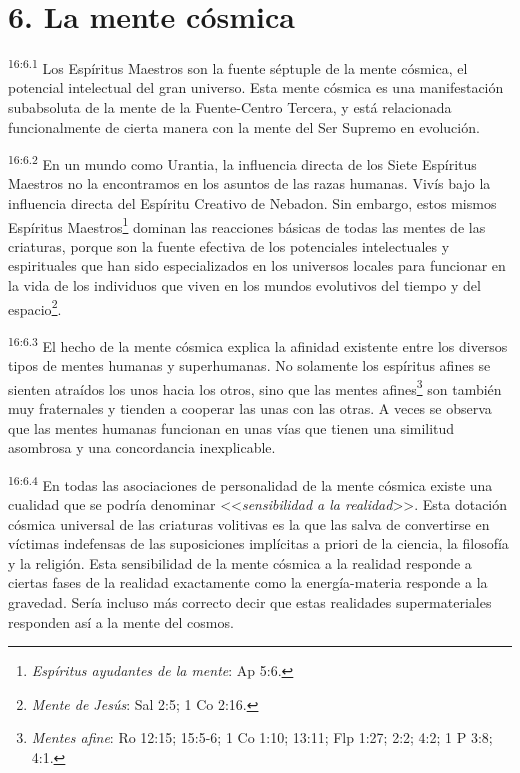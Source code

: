 \section*{6. La mente cósmica}
\par
\textsuperscript{16:6.1} Los Espíritus Maestros son la fuente séptuple de la mente cósmica, el potencial intelectual del gran universo. Esta mente cósmica es una manifestación subabsoluta de la mente de la Fuente-Centro Tercera, y está relacionada funcionalmente de cierta manera con la mente del Ser Supremo en evolución.

\par
\textsuperscript{16:6.2} En un mundo como Urantia, la influencia directa de los Siete Espíritus Maestros no la encontramos en los asuntos de las razas humanas. Vivís bajo la influencia directa del Espíritu Creativo de Nebadon. Sin embargo, estos mismos Espíritus Maestros\footnote{\textit{Espíritus ayudantes de la mente}: Ap 5:6.} dominan las reacciones básicas de todas las mentes de las criaturas, porque son la fuente efectiva de los potenciales intelectuales y espirituales que han sido especializados en los universos locales para funcionar en la vida de los individuos que viven en los mundos evolutivos del tiempo y del espacio\footnote{\textit{Mente de Jesús}: Sal 2:5; 1 Co 2:16.}.

\par
\textsuperscript{16:6.3} El hecho de la mente cósmica explica la afinidad existente entre los diversos tipos de mentes humanas y superhumanas. No solamente los espíritus afines se sienten atraídos los unos hacia los otros, sino que las mentes afines\footnote{\textit{Mentes afine}: Ro 12:15; 15:5-6; 1 Co 1:10; 13:11; Flp 1:27; 2:2; 4:2; 1 P 3:8; 4:1.} son también muy fraternales y tienden a cooperar las unas con las otras. A veces se observa que las mentes humanas funcionan en unas vías que tienen una similitud asombrosa y una concordancia inexplicable.

\par
\textsuperscript{16:6.4} En todas las asociaciones de personalidad de la mente cósmica existe una cualidad que se podría denominar <<\textit{sensibilidad a la realidad}>>. Esta dotación cósmica universal de las criaturas volitivas es la que las salva de convertirse en víctimas indefensas de las suposiciones implícitas a priori de la ciencia, la filosofía y la religión. Esta sensibilidad de la mente cósmica a la realidad responde a ciertas fases de la realidad exactamente como la energía-materia responde a la gravedad. Sería incluso más correcto decir que estas realidades supermateriales responden así a la mente del cosmos.

